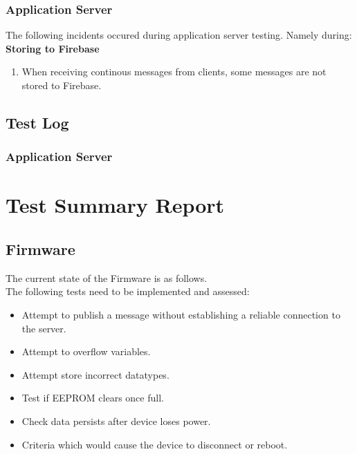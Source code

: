 \documentclass[a4paper,10pt]{article}
\begin{document}
			\subsubsection{Application Server}
			The following incidents occured during application server testing. Namely during:
			\textbf{Storing to Firebase}
				\begin{enumerate}
					\item When receiving continous messages from clients, some messages are not stored to Firebase.
				\end{enumerate}
			
		\subsection{Test Log}
			\subsubsection{Application Server}
	
	\section{Test Summary Report}
		\subsection{Firmware}
			The current state of the Firmware is as follows.
			\\The following tests need to be implemented and assessed:
			\begin{itemize}
				\item Attempt to publish a message without establishing a reliable connection to the server.
				\item Attempt to overflow variables.
				\item Attempt store incorrect datatypes.
				\item Test if EEPROM clears once full.
				\item Check data persists after device loses power.
				\item Criteria which would cause the device to disconnect or reboot.
			\end{itemize}
\end{document}
